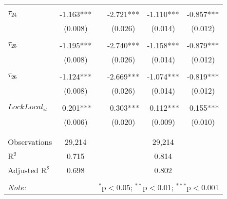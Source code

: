 \begin{tabular}{@{\extracolsep{-5pt}}lccccc}
                &           &&           &           &           \\[-2.1ex]
$\tau_{24}$     & -1.163*** && -2.721*** & -1.110*** & -0.857*** \\
                &  (0.008)  &&  (0.026)  &  (0.014)  &  (0.012)  \\
                &           &&           &           &           \\[-2.1ex]
$\tau_{25}$     & -1.195*** && -2.740*** & -1.158*** & -0.879*** \\
                &  (0.008)  &&  (0.026)  &  (0.014)  &  (0.012)  \\
                &           &&           &           &           \\[-2.1ex]
$\tau_{26}$     & -1.124*** && -2.669*** & -1.074*** & -0.819*** \\
                &  (0.008)  &&  (0.026)  &  (0.014)  &  (0.012)  \\
                &           &&           &           &           \\[-1.ex]
$LockLocal_{it}$ & -0.201*** && -0.303*** & -0.112*** & -0.155*** \\
                &  (0.006)  &&  (0.020)  &  (0.009)  &  (0.010)  \\
                &           &&           &           &           \\[-2.1ex]
\hline \\[-1.8ex] 
Observations     & 29,214 && \multicolumn{3}{c}{29,214} \\ 
R$^{2}$          &  0.715 && \multicolumn{3}{c}{0.814 } \\ 
Adjusted R$^{2}$ &  0.698 && \multicolumn{3}{c}{0.802 } \\ 
\hline 
\hline \\[-1.8ex] 
\textit{Note:}  & \multicolumn{5}{r}{$^{*}$p$<$0.05; $^{**}$p$<$0.01; $^{***}$p$<$0.001} \\ 
\end{tabular} 